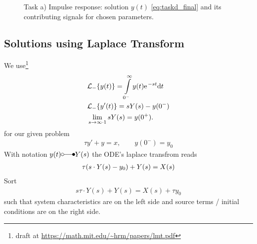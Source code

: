 \documentclass[11pt,a4paper,DIV=12]{scrartcl}
\begin{document}
\begin{figure}[h!]
\centering
\caption{Task a) Impulse response: solution $y(t)$ \eqref{eq:taskd_final} and its contributing signals for chosen parameters.}
\end{figure}





\subsection{Solutions using Laplace Transform}
%
We use\footnote{\cite{Lundberg2007} draft at \url{https://math.mit.edu/~hrm/papers/lmt.pdf}}
\begin{align}
&\mathcal{L}_-\{y(t)\}	= \int\limits_{0^-}^{\infty} y(t) \e^{-s t} \fsd t\\
&\mathcal{L}_-\{y'(t)\} = s Y(s) - y(0^-)\\
&\lim_{s \to \infty \cdot 1} s Y(s) = y(0^+).
\end{align}
for our given problem
\begin{align}
\tau y' + y = x, \qquad y(0^-) = y_0
\end{align}
With notation $y(t) \laplace Y(s)$ the ODE's laplace transfrom reads
\begin{align}
\tau \large(s \cdot Y(s) - y_0\large) + Y(s) = X(s)
\end{align}
Sort
\begin{align}
s \tau \cdot Y(s) + Y(s) = X(s) + \tau y_0
\label{eq:laplace_ansatz}
\end{align}
such that system characteristics are on the left side and source terms / initial conditions are on the right side.
\end{document}
